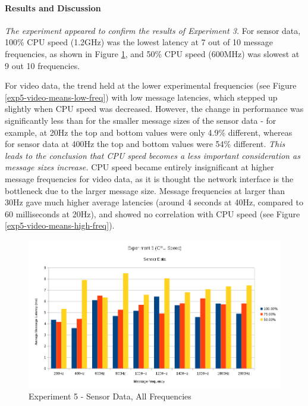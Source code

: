 \documentclass[../dissertation.tex]{subfiles}
\begin{document}
\paragraph{Results and Discussion} \textit{The experiment appeared to confirm the results of Experiment 3.} For sensor data, 100\% CPU speed (1.2GHz) was the lowest latency at 7 out of 10 message frequencies, as shown in Figure \ref{exp5-sensor-means-all-freq}, and 50\% CPU speed (600MHz) was slowest at 9 out 10 frequencies.

For video data, the trend held at the lower experimental frequencies (see Figure \ref{exp5-video-means-low-freq}) with low message latencies, which stepped up slightly when CPU speed was decreased. However, the change in performance was significantly less than for the smaller message sizes of the sensor data - for example, at 20Hz the top and bottom values were only 4.9\% different, whereas for sensor data at 400Hz the top and bottom values were 54\% different. \textit{This leads to the conclusion that CPU speed becomes a less important consideration as message sizes increase.} CPU speed became entirely insignificant at higher message frequencies for video data, as it is thought the network interface is the bottleneck due to the larger message size. Message frequencies at larger than 30Hz gave much higher average latencies (around 4 seconds at 40Hz, compared to 60 milliseconds at 20Hz), and showed no correlation with CPU speed (see Figure \ref{exp5-video-means-high-freq}).

\begin{figure}[H]
\centering
\includegraphics[width=\textwidth]{images/experiment5/sensor_data_all_freqs.png}
\caption{Experiment 5 - Sensor Data, All Frequencies}
\label{exp5-sensor-means-all-freq}
\end{figure}
\end{document}
